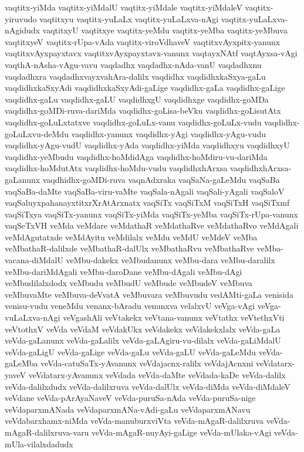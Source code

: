 {vaqtitx-yiMda
vaqtitx-yiMdalU
vaqtitx-yiMdale
vaqtitx-yiMdaleV
vaqtitx-yiruvudo
vaqtitxyu
vaqtitx-yuLaLx
vaqtitx-yuLaLxva-nAgi
vaqtitx-yuLaLxva-nAgidudx
vaqtitxyU
vaqtitxye
vaqtitx-yeMdu
vaqtitx-yeMba
vaqtitx-yeMbuva
vaqtitxyeV
vaqtitx-rUpa-vAda
vaqtitx-viroVdhaveV
vaqtitxvAyxpitx-yanunx
vaqtitxvAyxpayxtavx
vaqtitxvAyxpayxtavx-vanunx
vaqtayxNAtf
vaqtAyxsa-vAgi
vaqthA-nAsha-vAgu-vavu
vaqdadhx
vaqdadhx-nAda-vanU
vaqdadhxnu
vaqdadhxra
vaqdadhxvayxvahAra-dalilx
vaqdidhx
vaqdidhxkaSxya-gaLu
vaqdidhxkaSxyAdi
vaqdidhxkaSxyAdi-gaLige
vaqdidhx-gaLa
vaqdidhx-gaLige
vaqdidhx-gaLu
vaqdidhx-gaLU
vaqdidhxgU
vaqdidhxge
vaqdidhx-goMDa
vaqdidhx-goMDi-ruva-dariMda
vaqdidhx-goLisa-beVku
vaqdidhx-goLisutAtx
vaqdidhx-goLuLxtatxve
vaqdidhx-goLuLx-vanu
vaqdidhx-goLuLx-vudu
vaqdidhx-goLuLxvu-deMdu
vaqdidhx-yanunx
vaqdidhx-yAgi
vaqdidhx-yAgu-vudu
vaqdidhx-yAgu-vudU
vaqdidhx-yAda
vaqdidhx-yiMda
vaqdidhxyu
vaqdidhxyU
vaqdidhx-yeMbudu
vaqdidhx-hoMdidAga
vaqdidhx-hoMdiru-vu-dariMda
vaqdidhx-hoMdutAtx
vaqdidhx-hoMdu-vudu
vaqdidhxhArxsa
vaqdidhxhArxsa-gaLanunx
vaqdhidhx-goMDi-ruva
vaqnAdxraka
vaqSaNa-gaLeMdu
vaqSaBa
vaqSaBa-daMte
vaqSaBa-viru-vaMte
vaqSala-nAgali
vaqSali-yAgali
vaqSaloV
vaqSaluyxpahanayxtitxrXrAtArxnatx
vaqSiTx
vaqSiTxM
vaqSiTxH
vaqSiTxmf
vaqSiTxya
vaqSiTx-yanunx
vaqSiTx-yiMda
vaqSiTx-yeMba
vaqSiTx-rUpa-vanunx
vaqSeTxVH
veMda
veMdare
veMdathaR
veMdathaRve
veMdathaRvo
veMdAgali
veMdAgutatxde
veMdAyitu
veMdilalx
veMdu
veMdU
veMdeV
veMba
veMbathaR-dalilxde
veMbathaR-dalUlx
veMbathaRvu
veMbathaRve
veMba-vacana-diMdalU
veMbu-dakekx
veMbudanunx
veMbu-dara
veMbu-daralilx
veMbu-dariMdAgali
veMbu-daroDane
veMbu-dAgali
veMbu-dAgi
veMbudilalxdodx
veMbudu
veMbudU
veMbude
veMbudeV
veMbuva
veMbuvaMte
veMbuva-deVvatA
veMbuvara
veMbuvudu
vedAMti-gaLa
venisida
venisu-vudu
veneMdu
venanx-bAradu
venunxva
velalxvU
veVga-vAgi
veVga-vuLaLxva-nAgi
veVgashAli
veVtakekx
veVtana-vanunx
veVtathx
veVtethxVti
veVtothxV
veVda
veVdaM
veVdakUkx
veVdakekx
veVdakekxlalx
veVda-gaLa
veVda-gaLanunx
veVda-gaLalilx
veVda-gaLAgiru-vu-dilalx
veVda-gaLiMdalU
veVda-gaLigU
veVda-gaLige
veVda-gaLu
veVda-gaLU
veVda-gaLeMdu
veVda-gaLeMba
veVda-catuSaTx-yAvanunx
veVdajacnx-ralilx
veVdajAcnxni
veVdatarx-yaveV
veVdatarx-yAvanunx
veVdada
veVda-daMte
veVdada-kaDe
veVda-dalilx
veVda-dalilxdudx
veVda-dalilxruva
veVda-dalUlx
veVda-diMda
veVda-diMdaleV
veVdane
veVda-pArAyaNaveV
veVda-puruSa-nAda
veVda-puruSa-nige
veVdaparxmANada
veVdaparxmANa-vAdi-gaLu
veVdaparxmANavu
veVdabarxhamx-niMda
veVda-manuburxviVta
veVda-mAgaR-dalilxruva
veVda-mAgaR-dalilxruva-varu
veVda-mAgaR-nuyAyi-gaLige
veVda-mUlaka-vAgi
veVda-mUla-vilalxdadudx
}

